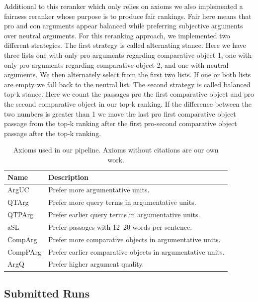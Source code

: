 Additional to this reranker which only relies on axioms we also implemented a fairness reranker whose purpose is to produce fair rankings. Fair here means that pro and con arguments appear balanced while preferring subjective arguments over neutral arguments. For this reranking approach, we implemented two different strategies. The first strategy is called alternating stance. Here we have three lists one with only pro arguments regarding comparative object 1, one with only pro arguments regarding comparative object 2, and one with neutral arguments. We then alternately select from the first two lists. If one or both lists are empty we fall back to the neutral list. The second strategy is called balanced top-k stance. Here we count the passages pro the first comparative object and pro the second comparative object in our top-k ranking. If the difference between the two numbers is greater than 1 we move the last pro first comparative object passage from the top-k ranking after the first pro-second comparative object passage after the top-k ranking.     

\begin{table}
    \caption{Axioms used in our pipeline. Axioms without citations are our own work.}
    \label{table-axioms}
    \begin{tabular}{ll}
        \toprule
        \textbf{Name} & \textbf{Description} \\
        \midrule
        ArgUC~\cite{bondarenko:2018} & Prefer more argumentative units. \\
        QTArg~\cite{bondarenko:2018} & Prefer more query terms in argumentative units. \\
        QTPArg~\cite{bondarenko:2018} & Prefer earlier query terms in argumentative units. \\
        aSL~\cite{bondarenkoaxiomatic} & Prefer passages with 12–20 words per sentence. \\
        CompArg & Prefer more comparative objects in argumentative units. \\
        CompPArg & Prefer earlier comparative objects in argumentative units. \\
        ArgQ & Prefer higher argument quality. \\ 
        \bottomrule
    \end{tabular}
\end{table}

\subsection{Submitted Runs}

